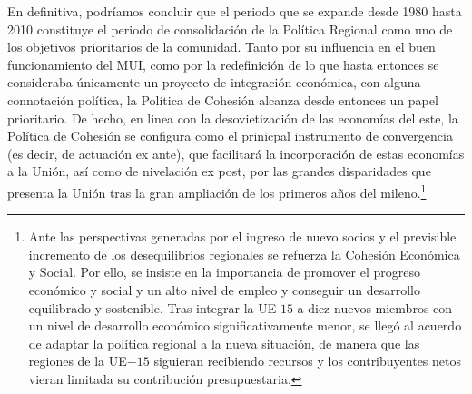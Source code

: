 \documentclass[10pt,a4paper]{article}
\begin{document}
En definitiva, podríamos concluir que el periodo que se expande desde 1980 hasta 2010 constituye el periodo de consolidación de la Política Regional como uno de los objetivos prioritarios de la comunidad. Tanto por su influencia en el buen funcionamiento del MUI, como por la redefinición de lo que hasta entonces se consideraba únicamente un proyecto de integración económica, con alguna connotación política, la Política de Cohesión alcanza desde entonces un papel prioritario. De hecho, en linea con la desovietización de las economías del este, la Política de Cohesión se configura como el prinicpal instrumento de convergencia (es decir, de actuación ex ante), que facilitará la incorporación de estas economías a la Unión, así como de nivelación ex post, por las grandes disparidades que presenta la Unión tras la gran ampliación de los primeros años del mileno.\footnote{%
    Ante las perspectivas generadas por el ingreso de nuevo socios y el previsible incremento de los desequilibrios regionales se refuerza la Cohesión Económica y Social. Por ello, se insiste en la importancia de promover el progreso económico y social y un alto nivel de empleo y conseguir un desarrollo equilibrado y sostenible. Tras integrar la UE-$15$ a diez nuevos miembros con un nivel de desarrollo económico significativamente menor, se llegó al acuerdo de adaptar la política regional a la nueva situación, de manera que las regiones de la UE$-15$ siguieran recibiendo recursos y los contribuyentes netos vieran limitada su contribución presupuestaria.
}
\end{document}
